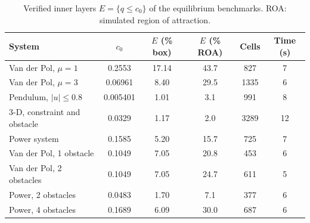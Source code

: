 \begin{table}[ht]
\centering\small
\caption{Verified inner layers $E=\{q\le c_0\}$ of the equilibrium benchmarks. ROA: simulated region of attraction.}
\label{tab:core}
\begin{tabular}{lccccc}
\toprule
System & $c_0$ & $E$ (\% box) & $E$ (\% ROA) & Cells & Time (s)\\
\midrule
Van der Pol, $\mu=1$ & 0.2553 & 17.14 & 43.7 & 827 & 7\\
Van der Pol, $\mu=3$ & 0.06961 & 8.40 & 29.5 & 1335 & 6\\
Pendulum, $|u|\le0.8$ & 0.005401 & 1.01 & 3.1 & 991 & 8\\
3-D, constraint and obstacle & 0.0329 & 1.17 & 2.0 & 3289 & 12\\
Power system & 0.1585 & 5.20 & 15.7 & 725 & 7\\
Van der Pol, 1 obstacle & 0.1049 & 7.05 & 20.8 & 453 & 6\\
Van der Pol, 2 obstacles & 0.1049 & 7.05 & 24.7 & 611 & 5\\
Power, 2 obstacles & 0.0483 & 1.70 & 7.1 & 377 & 6\\
Power, 4 obstacles & 0.1689 & 6.09 & 30.0 & 687 & 6\\
\bottomrule
\end{tabular}
\end{table}

